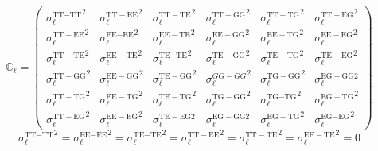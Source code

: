\begin{equation}
    \mathbb{C}_{\ell} = \left( \begin{array}{cccccc}
      {\sigma_{\ell}^{\textrm{TT$-$TT}}}^2 & {\sigma_{\ell}^{\mathrm{TT} -
      \mathrm{EE}}}^2 & {\sigma_{\ell}^{\mathrm{TT} - \mathrm{TE}}}^2 &
      {\sigma_{\ell}^{\mathrm{TT} - \mathrm{GG}}}^2 &
      {\sigma_{\ell}^{\mathrm{TT} - \mathrm{TG}}}^2 &
      {\sigma_{\ell}^{\mathrm{TT} - \mathrm{EG}}}^2\\
      {\sigma_{\ell}^{\mathrm{TT} - \mathrm{EE}}}^2 &
      {\sigma_{\ell}^{\textrm{EE$-$EE}}}^2 & {\sigma_{\ell}^{\mathrm{EE} -
      \mathrm{TE}}}^2 & {\sigma_{\ell}^{\mathrm{EE} - \mathrm{GG}}}^2 &
      {\sigma_{\ell}^{\mathrm{EE} - \mathrm{TG}}}^2 &
      {\sigma_{\ell}^{\mathrm{EE} - \mathrm{EG}}}^2\\
      {\sigma_{\ell}^{\mathrm{TT} - \mathrm{TE}}}^2 &
      {\sigma_{\ell}^{\mathrm{EE} - \mathrm{TE}}}^2 &
      {\sigma_{\ell}^{\textrm{TE$-$TE}}}^2 & {\sigma_{\ell}^{\mathrm{TE} -
      \mathrm{GG}}}^2 & {\sigma_{\ell}^{\mathrm{TE} - \mathrm{TG}}}^2 &
      {\sigma_{\ell}^{\mathrm{TE} - \mathrm{EG}}}^2\\
      {\sigma_{\ell}^{\mathrm{TT} - \mathrm{GG}}}^2 &
      {\sigma_{\ell}^{\mathrm{EE} - \mathrm{GG}}}^2 &
      {\sigma_{\ell}^{\mathrm{TE} - \mathrm{GG}}}^2 & {\sigma_{\ell}^{{GG}
      - {GG}}}^2 & {\sigma_{\ell}^{\mathrm{TG} - \mathrm{GG}}}^2 &
      \sigma_{\ell}^{\mathrm{EG} - \mathrm{GG}2}\\
      {\sigma_{\ell}^{\mathrm{TT} - \mathrm{TG}}}^2 &
      {\sigma_{\ell}^{\mathrm{EE} - \mathrm{TG}}}^2 &
      {\sigma_{\ell}^{\mathrm{TE} - \mathrm{TG}}}^2 &
      {\sigma_{\ell}^{\mathrm{TG} - \mathrm{GG}}}^2 &
      {\sigma_{\ell}^{\textrm{TG$-$TG}}}^2 & {\sigma_{\ell}^{\mathrm{EG} -
      \mathrm{TG}}}^2\\
      {\sigma_{\ell}^{\mathrm{TT} - \mathrm{EG}}}^2 &
      {\sigma_{\ell}^{\mathrm{EE} - \mathrm{EG}}}^2 & \sigma_{\ell}^{\mathrm{TE}
      - \mathrm{EG}2} & \sigma_{\ell}^{\mathrm{EG} - \mathrm{GG}2} &
      {\sigma_{\ell}^{\mathrm{EG} - \mathrm{TG}}}^2 &
      {\sigma_{\ell}^{\textrm{EG$-$EG}}}^2
    \end{array} \right)
  \end{equation}
  \begin{equation}
    {\sigma_{\ell}^{\textrm{TT$-$TT}}}^2 {= \sigma_{\ell}^{\textrm{EE$-$EE}}}^2
    {= \sigma_{\ell}^{\textrm{TE$-$TE}}}^2 {= \sigma_{\ell}^{\mathrm{TT} -
    \mathrm{EE}}}^2 {= \sigma_{\ell}^{\mathrm{TT} - \mathrm{TE}}}^2 {=
    \sigma_{\ell}^{\mathrm{EE} - \mathrm{TE}}}^2 = 0
  \end{equation}
